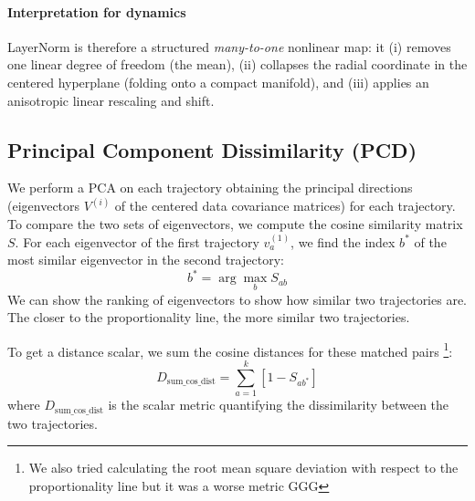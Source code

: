 \documentclass[a4paper,12pt]{article}
\begin{document}
\paragraph{Interpretation for dynamics} %
LayerNorm is therefore a structured \emph{many-to-one} nonlinear map: it (i) removes one linear degree of freedom (the mean), (ii) collapses the radial coordinate in the centered hyperplane (folding onto a compact manifold), and (iii) applies an anisotropic linear rescaling and shift.

\subsection{Principal Component Dissimilarity (PCD)}
\label{subsec:pca_distance} 


We perform a PCA on each trajectory obtaining the principal directions (eigenvectors $V^{(i)}$ of the centered data covariance matrices) for each trajectory. To compare the two sets of eigenvectors, we compute the cosine similarity matrix $S$.
For each eigenvector of the first trajectory $v^{(1)}_a$, we find the index $b^*$ of the most similar eigenvector in the second trajectory:
\[
b^* = \arg\max_b S_{ab}
\]
We can show the ranking of eigenvectors to show how similar two trajectories are. The closer to the proportionality line, the more similar two trajectories.

To get a distance scalar, we sum the cosine distances for these matched pairs \footnote{We also tried calculating the root mean square deviation with respect to the proportionality line but it was a worse metric GGG}:
\[
D_{\text{sum\_cos\_dist}} = \sum_{a=1}^k \left[1 - S_{a b^*}\right]
\]
where $D_{\text{sum\_cos\_dist}}$ is the scalar metric quantifying the dissimilarity between the two trajectories.
\end{document}
